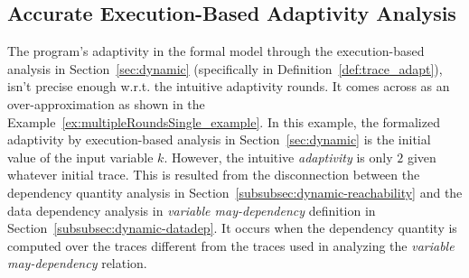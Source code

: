 \subsection{Accurate Execution-Based Adaptivity Analysis}
\label{subsec:furthers-dep-depth}
%
The program's adaptivity in the formal model through the execution-based analysis in Section~\ref{sec:dynamic}
(specifically in Definition~\ref{def:trace_adapt}), isn't precise enough w.r.t. the intuitive adaptivity rounds.
It comes across as an over-approximation 
as shown in the Example~\ref{ex:multipleRoundsSingle_example}.
In this example, the formalized adaptivity by execution-based analysis in Section~\ref{sec:dynamic} 
is the initial value of the input variable $k$.
However, the intuitive \emph{adaptivity} is only $2$ given whatever initial trace.
This is resulted from the
disconnection between the 
dependency quantity analysis in Section~\ref{subsubsec:dynamic-reachability} and 
the data dependency analysis in \emph{variable may-dependency} definition in Section~\ref{subsubsec:dynamic-datadep}.
It occurs when the 
dependency quantity is computed over the traces different from the traces used in 
analyzing the \emph{variable may-dependency} relation.

